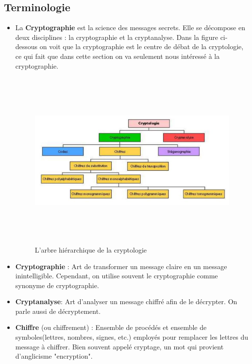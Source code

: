 		\subsection{Terminologie}
			\begin{itemize}
				\item La \textbf{Cryptographie} est la science des messages secrets. Elle se décompose en deux disciplines : la cryptographie et la cryptanalyse. Dans la figure ci-dessous on voit que la cryptographie est le centre de débat de la cryptologie, ce qui fait que dans cette section on va seulement nous intéressé à la cryptographie.
			\begin{figure}[H]
                                \centering
                                \includegraphics[width=16cm, height=9cm]{../imgs/discplinecrypto.png}
                                \caption{L'arbre hiérarchique de la cryptologie }
                                \label{discplinecrypto}
                        \end{figure}
				\item \textbf{Cryptographie} : Art de transformer un message claire en un message inintelligible. Cependant, on utilise souvent le cryptographie comme synonyme de cryptographie.
				\item \textbf{Cryptanalyse}: Art d'analyser un message chiffré afin de le décrypter. On parle aussi de décryptement.
				\item \textbf{Chiffre} (ou chiffrement) : Ensemble de procédés et ensemble de symboles(lettres, nombres, signes, etc.) employés pour remplacer les lettres du message à chiffrer. Bien souvent appelé cryptage, un mot qui provient d'anglicisme "encryption".


\end{itemize}
